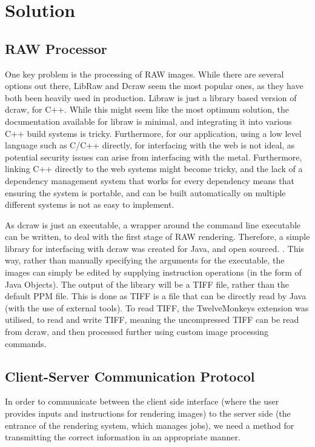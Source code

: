 \documentclass[10pt,a4paper]{article}
\begin{document}
\section{Solution}


\subsection{RAW Processor}
One key problem is the processing of RAW images. While there are several options out there, LibRaw and Dcraw seem the most popular ones, 
as they have both been heavily used in production. Libraw is just a library based version of dcraw, for C++. While this might seem like the most optimum
solution, the documentation available for libraw is minimal, and integrating it into various C++ build systems is tricky. Furthermore, for our application,
using a low level language such as C/C++ directly, for interfacing with the web is not ideal, as potential security issues can arise from interfacing with the
metal. Furthermore, linking C++ directly to the web systems might become tricky, and the lack of a dependency management system that works for every dependency
means that ensuring the system is portable, and can be built automatically on multiple different systems is not as easy to implement.

As dcraw is just an executable, a wrapper around the command line executable can be written, to deal with the first stage of RAW rendering.
Therefore, a simple library for interfacing with dcraw was created for Java, and open sourced. \cite{JDCRAW}. This way, rather than manually
specifying the arguments for the executable, the images can simply be edited by supplying instruction operations (in the form of Java Objects).
The output of the library will be a TIFF file, rather than the default PPM file. This is done as TIFF is a file that can be directly read by
Java (with the use of external tools). To read TIFF, the TwelveMonkeys extension \cite{TwelveMonkeys} was utilised, to read and write TIFF, meaning
the uncompressed TIFF can be read from dcraw, and then processed further using custom image processing commands. 
\subsection{Client-Server Communication Protocol}
In order to communicate between the client side interface (where the user provides inputs and instructions
for rendering images) to the server side (the entrance of the rendering system, which manages jobs), we need
a method for transmitting the correct information in an appropriate manner.
\end{document}

